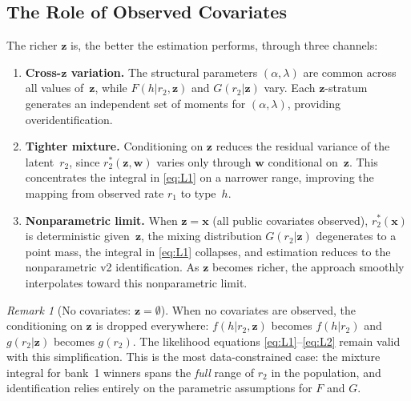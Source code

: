 \documentclass[12pt]{article}
\theoremstyle{plain}
\theoremstyle{plain}
\theoremstyle{definition}  %
\theoremstyle{remark}  %
\newtheorem{remark}[thm]{Remark}  %
\begin{document}
\subsection{The Role of Observed Covariates}\label{sec:covariates}

The richer $\mathbf{z}$ is, the better the estimation performs, through three channels:

\begin{enumerate}
    \item \textbf{Cross-$\mathbf{z}$ variation.} The structural parameters $(\alpha, \lambda)$ are common across all values of~$\mathbf{z}$, while $F(h|r_2, \mathbf{z})$ and $G(r_2|\mathbf{z})$ vary. Each $\mathbf{z}$-stratum generates an independent set of moments for $(\alpha, \lambda)$, providing overidentification.
    
    \item \textbf{Tighter mixture.} Conditioning on $\mathbf{z}$ reduces the residual variance of the latent~$r_2$, since $r_2^*(\mathbf{z}, \mathbf{w})$ varies only through $\mathbf{w}$ conditional on~$\mathbf{z}$. This concentrates the integral in \eqref{eq:L1} on a narrower range, improving the mapping from observed rate $r_1$ to type~$h$.
    
    \item \textbf{Nonparametric limit.} When $\mathbf{z} = \mathbf{x}$ (all public covariates observed), $r_2^*(\mathbf{x})$ is deterministic given~$\mathbf{z}$, the mixing distribution $G(r_2|\mathbf{z})$ degenerates to a point mass, the integral in \eqref{eq:L1} collapses, and estimation reduces to the nonparametric v2 identification. As $\mathbf{z}$ becomes richer, the approach smoothly interpolates toward this nonparametric limit.
\end{enumerate}

\begin{remark}[No covariates: $\mathbf{z} = \emptyset$]\label{rem:no_covariates}
When no covariates are observed, the conditioning on $\mathbf{z}$ is dropped everywhere: $f(h|r_2, \mathbf{z})$ becomes $f(h|r_2)$ and $g(r_2|\mathbf{z})$ becomes $g(r_2)$. The likelihood equations \eqref{eq:L1}--\eqref{eq:L2} remain valid with this simplification. This is the most data-constrained case: the mixture integral for bank~1 winners spans the \emph{full} range of $r_2$ in the population, and identification relies entirely on the parametric assumptions for $F$ and $G$.
\end{remark}
\end{document}
